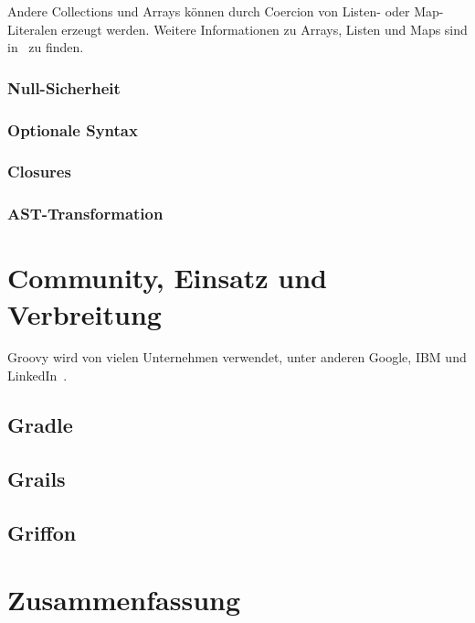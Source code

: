 	Andere Collections und Arrays können durch Coercion von Listen- oder Map-Literalen erzeugt werden.
	Weitere Informationen zu Arrays, Listen und Maps sind in~\cite[{Abs.} 7.-9.]{groovy-lang:syntax} zu finden.

	\subsubsection{Null-Sicherheit}

	\subsubsection{Optionale Syntax}\label{subsubsec:optionale-syntax}

	\subsubsection{Closures}\label{subsubsec:closures}

	\subsubsection{AST-Transformation}


	\section{Community, Einsatz und Verbreitung}\label{sec:community}

	Groovy wird von vielen Unternehmen verwendet, unter anderen Google, IBM und LinkedIn~\cite{groovy-lang:main,wiki:Groovy}.

	\subsection{Gradle}\label{subsec:gradle}

	\subsection{Grails}\label{subsec:grails}

	\subsection{Griffon}\label{subsec:griffon}


	\section{Zusammenfassung}\label{sec:zusammenfassung}


	
	


